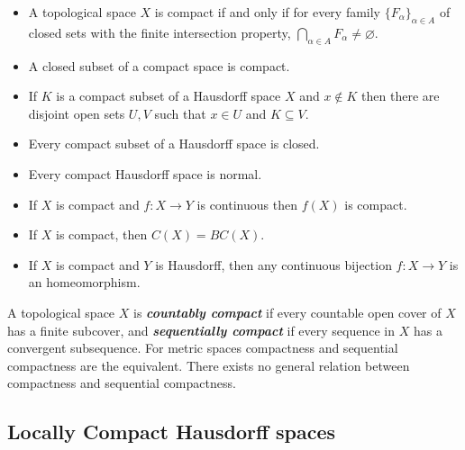 \documentclass{article}
\theoremstyle{definition}
\numberwithin{equation}{section}
\begin{document}
		\begin{prop}\leavevmode
			\begin{itemize}
				\item A topological space $X$ is compact if and only if for every family $\{F_\alpha\}_{\alpha\in A}$ of closed sets with the finite intersection property, $\bigcap_{\alpha\in A}F_\alpha\neq\varnothing$.
				\item A closed subset of a compact space is compact.
				\item If $K$ is a compact subset of a Hausdorff space $X$ and $x\notin K$ then there are disjoint open sets $U,V$ such that $x\in U$ and $K\subseteq V$.
				\item Every compact subset of a Hausdorff space is closed.
				\item Every compact Hausdorff space is normal.
				\item If $X$ is compact and $f:X\to Y$ is continuous then $f(X)$ is compact.
				\item If $X$ is compact, then $C(X)=BC(X)$.
				\item If $X$ is compact and $Y$ is Hausdorff, then any continuous bijection $f:X\to Y$ is an homeomorphism.
			\end{itemize}
		\end{prop}
		A topological space $X$ is \textbf{\textit{countably compact}} if every countable open cover of $X$ has a finite subcover, and \textbf{\textit{sequentially compact}} if every sequence in $X$ has a convergent subsequence. For metric spaces compactness and sequential compactness are the equivalent. There exists no general relation between compactness and sequential compactness.
		
		\subsection{Locally Compact Hausdorff spaces}
		
\end{document}
